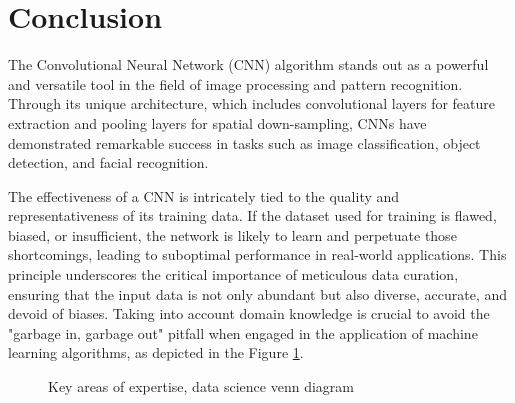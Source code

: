 \section{Conclusion}

The Convolutional Neural Network (CNN) algorithm stands out as a powerful and versatile tool in the field of image processing and pattern recognition. Through its unique architecture, which includes convolutional layers for feature extraction and pooling layers for spatial down-sampling, CNNs have demonstrated remarkable success in tasks such as image classification, object detection, and facial recognition.

The effectiveness of a CNN is intricately tied to the quality and representativeness of its training data. If the dataset used for training is flawed, biased, or insufficient, the network is likely to learn and perpetuate those shortcomings, leading to suboptimal performance in real-world applications. This principle underscores the critical importance of meticulous data curation, ensuring that the input data is not only abundant but also diverse, accurate, and devoid of biases. 
Taking into account domain knowledge is crucial to avoid the "garbage in, garbage out" pitfall when engaged in the application of machine learning algorithms, as depicted in the Figure \ref{fig:DataScienceVenn}.

\begin{figure}[h!]
	\centering
	
	\caption{Key areas of expertise, data science venn diagram} \label{fig:DataScienceVenn}
\end{figure}

